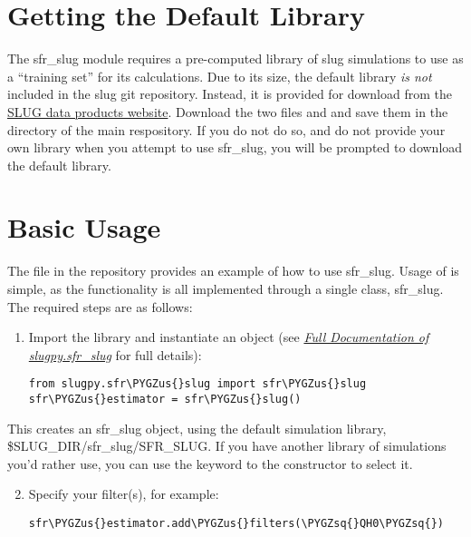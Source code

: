 \documentclass[letterpaper,10pt,english]{sphinxmanual}
\def\PYGZus{\char`\_}
\def\PYGZsq{\char`\'}
\renewcommand\PYGZsq{\textquotesingle}
\begin{document}
\section{Getting the Default Library}
\label{sfr_slug:getting-the-default-library}
The sfr\_slug module requires a pre-computed library of slug simulations to use as a ``training set'' for its calculations. Due to its size, the default library \emph{is not} included in the slug git repository. Instead, it is provided for download from the \href{http://www.slugsps.com/data}{SLUG data products website}. Download the two files  and  and save them in the  directory of the main respository. If you do not do so, and do not provide your own library when you attempt to use sfr\_slug, you will be prompted to download the default library.


\section{Basic Usage}
\label{sfr_slug:basic-usage}
The  file in the repository provides an example of how to use sfr\_slug. Usage of is simple, as the functionality is all implemented through a single class, sfr\_slug. The required steps are as follows:
\begin{enumerate}
\item {} 
Import the library and instantiate an  object (see {\hyperref[sfr_slug:sec-sfr-slug-full]{\emph{Full Documentation of slugpy.sfr\_slug}}} for full details):

\begin{Verbatim}[commandchars=\\\{\}]
from slugpy.sfr\PYGZus{}slug import sfr\PYGZus{}slug
sfr\PYGZus{}estimator = sfr\PYGZus{}slug()
\end{Verbatim}

\end{enumerate}

This creates an sfr\_slug object, using the default simulation library, \$SLUG\_DIR/sfr\_slug/SFR\_SLUG. If you have another library of simulations you'd rather use, you can use the  keyword to the  constructor to select it.
\begin{enumerate}
\setcounter{enumi}{1}
\item {} 
Specify your filter(s), for example:

\begin{Verbatim}[commandchars=\\\{\}]
sfr\PYGZus{}estimator.add\PYGZus{}filters(\PYGZsq{}QH0\PYGZsq{})
\end{Verbatim}

\end{enumerate}
\end{document}
